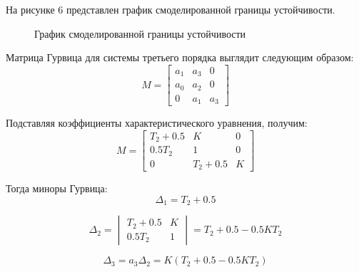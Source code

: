 \documentclass[a4paper, 11pt]{article}
\begin{document}
\par 
На рисунке 6 представлен график смоделированной границы устойчивости.

\begin{figure}[h!]
\centering
{}
\caption{График смоделированной границы устойчивости}
\end{figure}

\par 
Матрица Гурвица для системы третьего порядка выглядит следующим образом:
\begin{equation}
M=
\begin{bmatrix}
a_1 & a_3 & 0 \\
a_0 & a_2 & 0 \\
0 & a_1 & a_3 
\end{bmatrix}
\end{equation}

\newpage
\par 
Подставляя коэффициенты характеристического уравнения, получим:
\begin{equation}
M=
\begin{bmatrix}
T_2+0.5 & K & 0 \\
0.5T_2 & 1 & 0 \\
0 & T_2+0.5 & K
\end{bmatrix}
\end{equation}

\par 
Тогда миноры Гурвица:
\begin{equation}
\Delta_1=T_2+0.5
\end{equation}

\begin{equation}
\Delta_2=
\begin{vmatrix}
T_2+0.5 & K \\
0.5T_2 & 1
\end{vmatrix} 
=T_2+0.5-0.5KT_2
\end{equation}

\begin{equation}
\Delta_3=a_3\Delta_2=K(T_2+0.5-0.5KT_2)
\end{equation}
\end{document}
